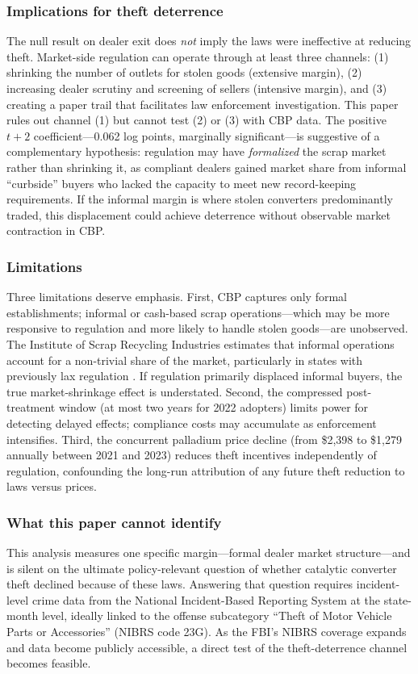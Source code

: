 \documentclass[12pt]{article}
\begin{document}
\subsubsection*{Implications for theft deterrence} The null result on dealer exit does \textit{not} imply the laws were ineffective at reducing theft. Market-side regulation can operate through at least three channels: (1) shrinking the number of outlets for stolen goods (extensive margin), (2) increasing dealer scrutiny and screening of sellers (intensive margin), and (3) creating a paper trail that facilitates law enforcement investigation. This paper rules out channel (1) but cannot test (2) or (3) with CBP data. The positive $t+2$ coefficient---0.062 log points, marginally significant---is suggestive of a complementary hypothesis: regulation may have \textit{formalized} the scrap market rather than shrinking it, as compliant dealers gained market share from informal ``curbside'' buyers who lacked the capacity to meet new record-keeping requirements. If the informal margin is where stolen converters predominantly traded, this displacement could achieve deterrence without observable market contraction in CBP.

\subsubsection*{Limitations} Three limitations deserve emphasis. First, CBP captures only formal establishments; informal or cash-based scrap operations---which may be more responsive to regulation and more likely to handle stolen goods---are unobserved. The Institute of Scrap Recycling Industries estimates that informal operations account for a non-trivial share of the market, particularly in states with previously lax regulation \citep{isri2023}. If regulation primarily displaced informal buyers, the true market-shrinkage effect is understated. Second, the compressed post-treatment window (at most two years for 2022 adopters) limits power for detecting delayed effects; compliance costs may accumulate as enforcement intensifies. Third, the concurrent palladium price decline (from \$2,398 to \$1,279 annually between 2021 and 2023) reduces theft incentives independently of regulation, confounding the long-run attribution of any future theft reduction to laws versus prices.

\subsubsection*{What this paper cannot identify} This analysis measures one specific margin---formal dealer market structure---and is silent on the ultimate policy-relevant question of whether catalytic converter theft declined because of these laws. Answering that question requires incident-level crime data from the National Incident-Based Reporting System at the state-month level, ideally linked to the offense subcategory ``Theft of Motor Vehicle Parts or Accessories'' (NIBRS code 23G). As the FBI's NIBRS coverage expands and data become publicly accessible, a direct test of the theft-deterrence channel becomes feasible.
\end{document}
